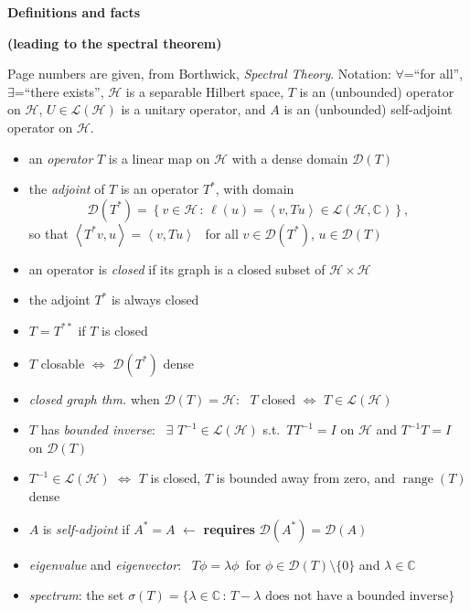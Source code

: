 \documentclass[12pt]{article}
\newcommand{\cD}{\mathcal{D}}
\newcommand{\cH}{\mathcal{H}}
\newcommand{\cL}{\mathcal{L}}
\newcommand{\CC}{\mathbb{C}}
\newcommand{\ip}[2]{\left<#1,#2\right>}
\newcommand{\range}{\operatorname{range}}
\newcommand{\sect}[1]{\subsection*{#1.}}
\begin{document}
\strut
\centerline{{\Large \textbf{Definitions and facts}}}

\large \smallskip
\centerline{{\textbf{(leading to the spectral theorem)}}}
\bigskip

\normalsize
Page numbers are given, from Borthwick, \emph{Spectral Theory}.  Notation: $\forall$=``for all'', $\exists$=``there exists'', $\cH$ is a separable Hilbert space, $T$ is an (unbounded) operator on $\cH$, $U \in \cL(\cH)$ is a unitary operator, and $A$ is an (unbounded) self-adjoint operator on $\cH$.


\newcommand{\itwo}[2]{{\small \textbf{#1}} {\footnotesize p #2} \,\,}
\newcommand{\df}[1]{\,\itwo{def}{#1}}
\newcommand{\ft}[1]{\itwo{\underline{fact}}{#1}}

\begin{itemize}[leftmargin=10mm,itemsep=0mm]
\item[\df{36}] an \emph{operator} $T$ is a linear map on $\cH$ with a dense domain $\cD(T)$
\item[\df{38}] the \emph{adjoint} of $T$ is an operator $T^*$, with domain
	$$\cD(T^*) = \left\{v\in\cH\,:\,\ell(u)=\ip{v}{Tu} \in \cL(\cH,\CC)\right\},$$
so that $\ip{T^* v}{u} = \ip{v}{Tu}$ \, for all $v\in\cD(T^*)$, $u\in\cD(T)$
\item[\df{41}] an operator is \emph{closed} if its graph is a closed subset of $\cH\times \cH$
\item[\ft{43}] the adjoint $T^*$ is always closed
\item[\ft{44}] $T=T^{**}$ if $T$ is closed
\item[\ft{44}] $T$ closable $\iff$ $\cD(T^*)$ dense
\item[\ft{44}] \emph{closed graph thm.} when $\cD(T)=\cH$: \, $T$ closed $\iff$ $T\in\cL(\cH)$
\item[\df{46}] $T$ has \emph{bounded inverse}: \, $\exists$ $T^{-1}\in\cL(\cH)$ s.t.~$TT^{-1}=I$ on $\cH$ and $T^{-1}T=I$ on $\cD(T)$
\item[\ft{46}] $T^{-1}\in\cL(\cH)$ $\iff$ $T$ is closed, $T$ is bounded away from zero, and $\range(T)$ dense
\item[\df{47}] $A$ is \emph{self-adjoint} if $A^*=A$ \hfill $\leftarrow$ \textbf{requires} $\cD(A^*)=\cD(A)$
\item[\df{67}] \emph{eigenvalue} and \emph{eigenvector}: \, $T\phi=\lambda\phi$ \,for $\phi\in\cD(T)\setminus\{0\}$ and $\lambda\in\CC$
\item[\df{68}] \emph{spectrum}: the set $\sigma(T)=\{\lambda \in\CC\,:\,T - \lambda \text{ does not have a bounded inverse}\}$

\end{itemize}
\end{document}
